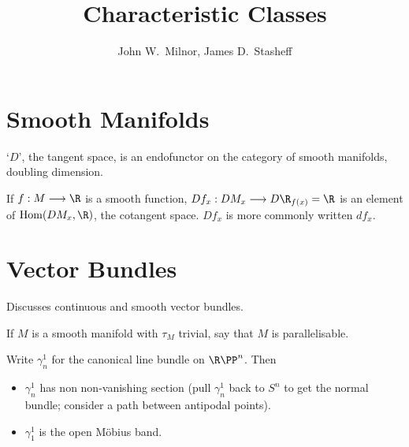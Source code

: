 \documentclass[11pt]{article}
\title{Characteristic Classes}
\author{John W.\ Milnor, James D.\ Stasheff}
\date{}
\begin{document}
\maketitle

\section{Smooth Manifolds}
\begin{itemise}
\item `$D$', the tangent space, is an endofunctor on the category of smooth manifolds, doubling dimension.
\item If $f:M\to \R$ is a smooth function, $Df_x:DM_x\to D\R_{f(x)}=\R$ is an element of $\Hom(DM_x,\R)$, the cotangent space. $Df_x$ is more commonly written $df_x$.
\end{itemise}
\section{Vector Bundles}
\begin{itemise}
\item Discusses continuous and smooth vector bundles.
\item If $M$ is a smooth manifold with $\tau_M$ trivial, say that $M$ is parallelisable.
\item Write $\gamma_n^1$ for the canonical line bundle on $\RP^n$. Then
\begin{itemize}\squishlist
\item $\gamma_n^1$ has non non-vanishing section (pull $\gamma_n^1$ back to $S^n$ to get the normal bundle; consider a path between antipodal points).
\item $\gamma_1^1$ is the open M\"obius band.
\end{itemize}
\end{itemise}
\end{document}
